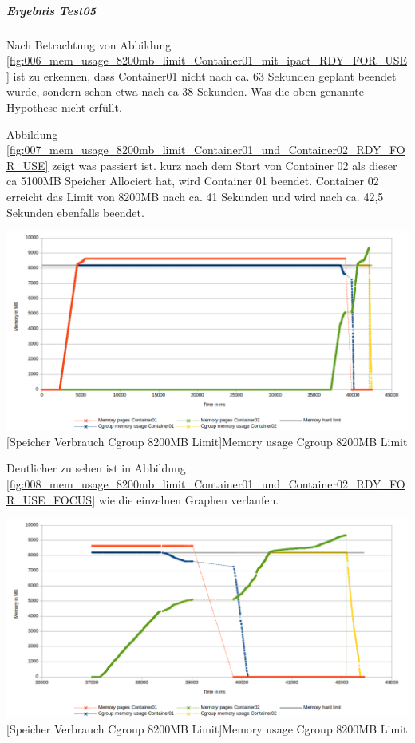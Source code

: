 \subparagraph{Ergebnis Test05}
Nach Betrachtung von Abbildung \ref{fig:006_mem_usage_8200mb_limit_Container01_mit_ipact_RDY_FOR_USE} ist zu erkennen, dass Container01 nicht nach ca. 63 Sekunden geplant beendet wurde, sondern schon etwa nach ca 38 Sekunden. Was die oben genannte Hypothese nicht erfüllt.

Abbildung \ref{fig:007_mem_usage_8200mb_limit_Container01_und_Container02_RDY_FOR_USE} zeigt was passiert ist. kurz nach dem Start von Container 02 als dieser ca 5100MB Speicher Allociert hat, wird Container 01 beendet. Container 02 erreicht das Limit von 8200MB nach ca. 41 Sekunden und wird nach ca. 42,5 Sekunden ebenfalls beendet.

\vspace{1em}
\begin{minipage}{\linewidth}
	\centering
	\includegraphics[width=1\linewidth]{pics/007_mem_usage_8200mb_limit_Container01_und_Container02_RDY_FOR_USE.png}
	[Speicher Verbrauch Cgroup 8200MB Limit]{Memory usage Cgroup 8200MB Limit}
	\label{fig:007_mem_usage_8200mb_limit_Container01_und_Container02_RDY_FOR_USE}
\end{minipage}

Deutlicher zu sehen ist in Abbildung \ref{fig:008_mem_usage_8200mb_limit_Container01_und_Container02_RDY_FOR_USE_FOCUS} wie die einzelnen Graphen verlaufen. 


\vspace{1em}
\begin{minipage}{\linewidth}
	\centering
	\includegraphics[width=1\linewidth]{pics/008_mem_usage_8200mb_limit_Container01_und_Container02_RDY_FOR_USE_FOCUS.png}
	[Speicher Verbrauch Cgroup 8200MB Limit]{Memory usage Cgroup 8200MB Limit}
	\label{fig:008_mem_usage_8200mb_limit_Container01_und_Container02_RDY_FOR_USE_FOCUS}
\end{minipage}

\pagebreak

